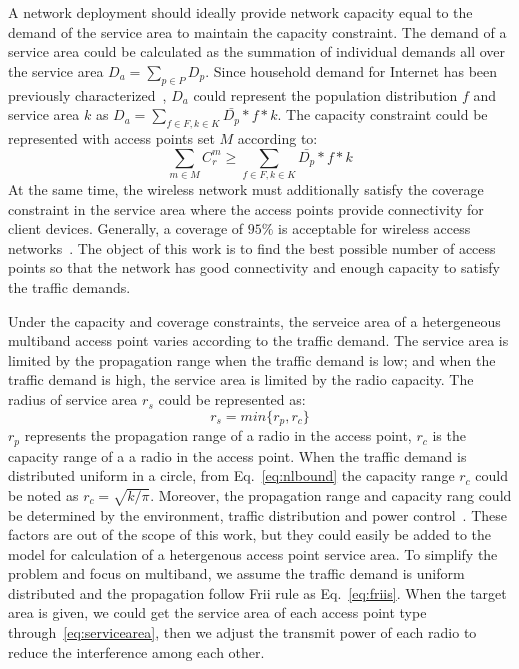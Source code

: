 A network deployment should ideally provide network capacity equal to the demand of the service 
area to maintain the capacity constraint. The demand of a service area could be calculated as the 
summation of individual demands all over the service area $D_a=\sum_{p\in P}D_p$. Since 
household demand for Internet has been previously characterized~\cite{rosston2011household}, 
$D_a$ could represent the population distribution $f$ and service area $k$ as 
$D_a=\sum_{f \in F,k \in K}\bar{D_p}*f*k$. 
The capacity constraint could be represented with access points set $M$ according to:
\begin{equation}
\label{eq:nlbound}
\sum_{m \in M}C_r^m \ge \sum_{f \in F,k \in K}\bar{D_p}*f*k
\end{equation}
At the same time, the wireless network must additionally satisfy the coverage constraint in the service 
area where the access points provide connectivity for client devices. 
Generally, a coverage of $95\%$ is acceptable for wireless access networks~\cite{robinson2010deploying}.
The object of this work is to find the best possible number of access points so that the network has good 
connectivity and enough capacity to satisfy the traffic demands.


Under the capacity and coverage constraints, the serveice area of a hetergeneous multiband access point 
varies according to the traffic demand. The service area is limited by the propagation range when the traffic 
demand is low; and when the traffic demand is high, the service area is limited by the radio capacity.
The radius of service area $r_s$ could be represented as:
\begin{equation}
\label{eq:servicearea}
r_s=min\{r_p,r_c\}
\end{equation}
$r_p$ represents the propagation range of a radio in the access point, $r_c$ is the capacity range of 
a a radio in the access point. When the traffic demand is distributed uniform in a circle, from 
Eq.~\ref{eq:nlbound} the capacity range $r_c$ could be noted as $r_c=\sqrt{k/\pi}$. Moreover,
the propagation range and capacity rang could be determined by the environment, traffic distribution and
power control~\cite{robinson2010deploying}. These factors are out of the scope of this work, but they could
easily be added to the model for calculation of a hetergenous access point service area. To simplify the 
problem and focus on multiband, we assume the traffic demand is uniform distributed and the propagation 
follow Frii rule as Eq.~\ref{eq:friis}. When the target area is given, we could get the service area of
each access point type through~\ref{eq:servicearea}, then we adjust the transmit power of each radio
to reduce the interference among each other.

